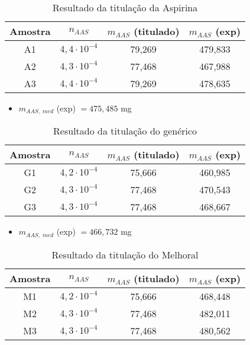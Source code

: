 \begin{table}[H]
    \centering
    \begin{tabular}{c c c c}
        \toprule
        Amostra & $n_{AAS}$ & $m_{AAS}$ (titulado) & $m_{AAS}$ (exp) \\
        \midrule
        A1 & $4,4\cdot 10^{-4}$ & 79,269 & 479,833 \\
        A2 & $4,3\cdot 10^{-4}$ & 77,468 & 467,988\\
        A3 & $4,4\cdot 10^{-4}$ & 79,269 & 478,635 \\
        \bottomrule
    \end{tabular}
    \caption{Resultado da titulação da Aspirina\R}
    \label{res_aspirina}
\end{table}

\begin{itemize}
    \item $m_{AAS,\; med}$ (exp) $= 475,485$ mg
\end{itemize}

\begin{table}[H]
    \centering
    \begin{tabular}{c c c c}
        \toprule
        Amostra & $n_{AAS}$ & $m_{AAS}$ (titulado) & $m_{AAS}$ (exp) \\
        \midrule
        G1 & $4,2\cdot 10^{-4}$ & 75,666 & 460,985 \\
        G2 & $4,3\cdot 10^{-4}$ & 77,468 & 470,543 \\
        G3 & $4,3\cdot 10^{-4}$ & 77,468 & 468,667 \\
        \bottomrule
    \end{tabular}
    \caption{Resultado da titulação do genérico}
    \label{res_generico}
\end{table}

\begin{itemize}
    \item $m_{AAS,\; med}$ (exp) $= 466,732$ mg
\end{itemize}

\begin{table}[H]
    \centering
    \begin{tabular}{c c c c}
        \toprule
        Amostra & $n_{AAS}$ & $m_{AAS}$ (titulado) & $m_{AAS}$ (exp) \\
        \midrule
        M1 & $4,2\cdot 10^{-4}$ & 75,666 & 468,448 \\
        M2 & $4,3\cdot 10^{-4}$ & 77,468 & 482,011 \\
        M3 & $4,3\cdot 10^{-4}$ & 77,468 & 480,562 \\
        \bottomrule
    \end{tabular}
    \caption{Resultado da titulação do Melhoral\R}
    \label{res_melhoral}
\end{table}

